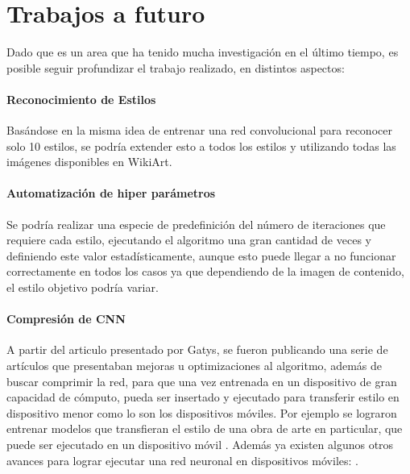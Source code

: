 \documentclass[a4paper,11pt,spanish]{book}
\begin{document}
  \section{Trabajos a futuro}
    Dado que es un area que ha tenido mucha investigación en el último tiempo, es posible seguir profundizar el trabajo realizado, en distintos aspectos:
    \paragraph{Reconocimiento de Estilos}
      Basándose en la misma idea de entrenar una red convolucional para reconocer solo 10 estilos, se podría extender esto a todos los estilos y utilizando todas las imágenes disponibles
      en WikiArt.
    \paragraph{Automatización de hiper parámetros}
      Se podría realizar una especie de predefinición del número de iteraciones que requiere cada estilo, ejecutando el algoritmo una gran cantidad de veces y definiendo este valor
      estadísticamente, aunque esto puede llegar a no funcionar correctamente en todos los casos ya que dependiendo de la imagen de contenido, el estilo objetivo podría variar.
    \paragraph{Compresión de CNN}
      A partir del articulo presentado por Gatys, se fueron publicando una serie de artículos que presentaban mejoras u optimizaciones al algoritmo, además de buscar comprimir la red,
      para que una vez entrenada en un dispositivo de gran capacidad de cómputo, pueda ser insertado y ejecutado para transferir estilo en dispositivo menor como lo son los 
      dispositivos móviles.
      Por ejemplo se lograron entrenar modelos que transfieran el estilo de una obra de arte en particular, que puede ser ejecutado en un dispositivo móvil 
      \cite{Johnson2016Perceptual, UlyanovVL16}.
      Además ya existen algunos otros avances para lograr ejecutar una red neuronal en dispositivos móviles: \cite{MobileNets}. 


\printindex

\end{document}
